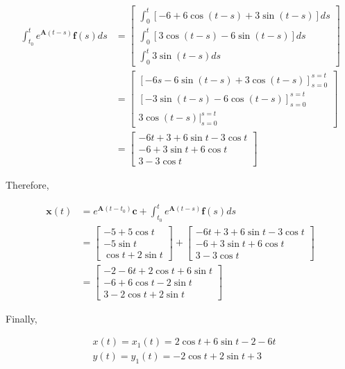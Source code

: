 \documentclass[10pt]{article}
\begin{document}
$$
\begin{aligned}
\int_{t_{0}}^{t} e^{\mathbf{A}(t-s)} \mathbf{f}(s) d s & =\left[\begin{array}{c}
\int_{0}^{t}[-6+6 \cos (t-s)+3 \sin (t-s)] d s \\
\int_{0}^{t}[3 \cos (t-s)-6 \sin (t-s)] d s \\
\int_{0}^{t} 3 \sin (t-s) d s
\end{array}\right] \\
& =\left[\begin{array}{c}
{[-6 s-6 \sin (t-s)+3 \cos (t-s)]_{s=0}^{s=t}} \\
{[-3 \sin (t-s)-6 \cos (t-s)]_{s=0}^{s=t}} \\
\left.3 \cos (t-s)\right|_{s=0} ^{s=t}
\end{array}\right] \\
& =\left[\begin{array}{c}
-6 t+3+6 \sin t-3 \cos t \\
-6+3 \sin t+6 \cos t \\
3-3 \cos t
\end{array}\right]
\end{aligned}
$$

Therefore,

$$
\begin{aligned}
\mathbf{x}(t) & =e^{\mathbf{A}\left(t-t_{0}\right)} \mathbf{c}+\int_{t_{0}}^{t} e^{\mathbf{A}(t-s)} \mathbf{f}(s) d s \\
& =\left[\begin{array}{c}
-5+5 \cos t \\
-5 \sin t \\
\cos t+2 \sin t
\end{array}\right]+\left[\begin{array}{c}
-6 t+3+6 \sin t-3 \cos t \\
-6+3 \sin t+6 \cos t \\
3-3 \cos t
\end{array}\right] \\
& =\left[\begin{array}{c}
-2-6 t+2 \cos t+6 \sin t \\
-6+6 \cos t-2 \sin t \\
3-2 \cos t+2 \sin t
\end{array}\right]
\end{aligned}
$$

Finally,

$$
\begin{aligned}
& x(t)=x_{1}(t)=2 \cos t+6 \sin t-2-6 t \\
& y(t)=y_{1}(t)=-2 \cos t+2 \sin t+3
\end{aligned}
$$
\end{document}
